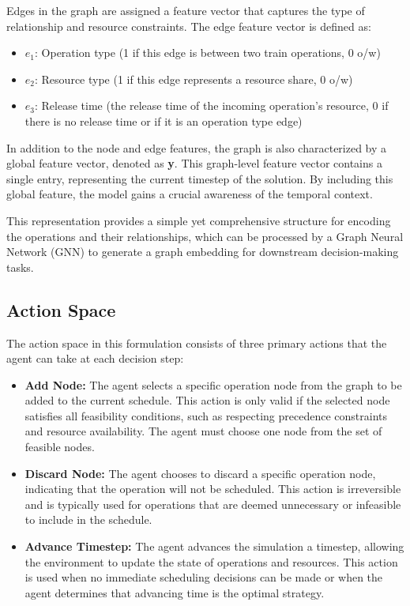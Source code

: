 \documentclass[runningheads]{llncs}
\begin{document}
Edges in the graph are assigned a feature vector that captures the type of relationship and resource constraints. 
The edge feature vector is defined as:
\begin{itemize}
    \item $e_1$: Operation type (1 if this edge is between two train operations, 0 o/w)
    \item $e_2$: Resource type (1 if this edge represents a resource share, 0 o/w)
    \item $e_3$: Release time (the release time of the incoming operation's resource, 0 if there is no release time or if it is an operation type edge)
\end{itemize}

In addition to the node and edge features, the graph is also characterized by a global feature vector, denoted as \textbf{y}. 
This graph-level feature vector contains a single entry, representing the current timestep of the solution. 
By including this global feature, the model gains a crucial awareness of the temporal context.

This representation provides a simple yet comprehensive structure for encoding the operations and their relationships, which can be processed by a Graph Neural Network (GNN) to generate a graph embedding for downstream decision-making tasks.

\subsection{Action Space}
\label{sss:action_space}
The action space in this formulation consists of three primary actions that the agent can take at each decision step:

\begin{itemize}
    \item \textbf{Add Node:} The agent selects a specific operation node from the graph to be added to the current schedule. This action is only valid if the selected node satisfies all feasibility conditions, such as respecting precedence constraints and resource availability. The agent must choose one node from the set of feasible nodes.

    \item \textbf{Discard Node:} The agent chooses to discard a specific operation node, indicating that the operation will not be scheduled. This action is irreversible and is typically used for operations that are deemed unnecessary or infeasible to include in the schedule.

    \item \textbf{Advance Timestep:} The agent advances the simulation a timestep, allowing the environment to update the state of operations and resources. This action is used when no immediate scheduling decisions can be made or when the agent determines that advancing time is the optimal strategy.
\end{itemize}
\end{document}
